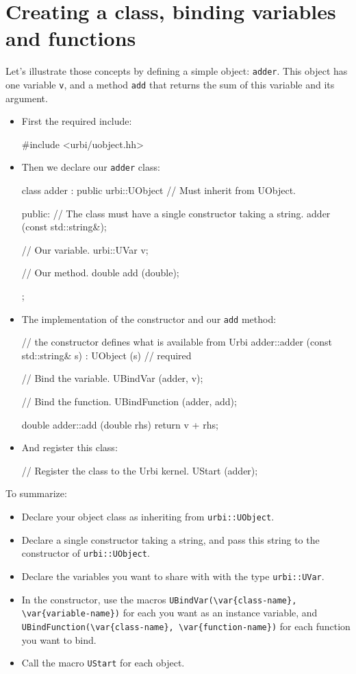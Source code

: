 \section{Creating a class, binding variables and functions}
\label{sec:uob:api:bind}

Let's illustrate those concepts by defining a simple object:
\lstinline{adder}. This object has one variable \lstinline{v}, and a
method \lstinline{add} that returns the sum of this variable and its
argument.

\begin{itemize}
\item First the required include:

\begin{cxx}
#include <urbi/uobject.hh>
\end{cxx}

\item Then we declare our \lstinline{adder} class:
\begin{cxx}
class adder : public urbi::UObject // Must inherit from UObject.
{
  public:
   // The class must have a single constructor taking a string.
   adder (const std::string&);

   // Our variable.
   urbi::UVar v;

   // Our method.
   double add (double);
};
\end{cxx}
\item The implementation of the constructor and our \lstinline{add}
  method:
\begin{cxx}
// the constructor defines what is available from Urbi
adder::adder (const std::string& s)
  : UObject (s) // required
{
  // Bind the variable.
  UBindVar (adder, v);

  // Bind the function.
  UBindFunction (adder, add);
}

double
adder::add (double rhs)
{
  return v + rhs;
}
\end{cxx}
\item And register this class:
\begin{cxx}
// Register the class to the Urbi kernel.
UStart (adder);
\end{cxx}
\end{itemize}

To summarize:

\begin{itemize}
\item Declare your object class as inheriting from
  \lstinline{urbi::UObject}.
\item Declare a single constructor taking a string, and pass this
  string to the constructor of \lstinline{urbi::UObject}.
\item Declare the variables you want to share with \urbi with the type
  \lstinline{urbi::UVar}.
\item In the constructor, use the macros
  \lstinline|UBindVar(\var{class-name}, \var{variable-name})|
  for each \UVar you want as an instance variable, and
  \lstinline|UBindFunction(\var{class-name}, \var{function-name})| for
  each function you want to bind.
\item Call the macro \lstinline{UStart} for each object.
\end{itemize}

